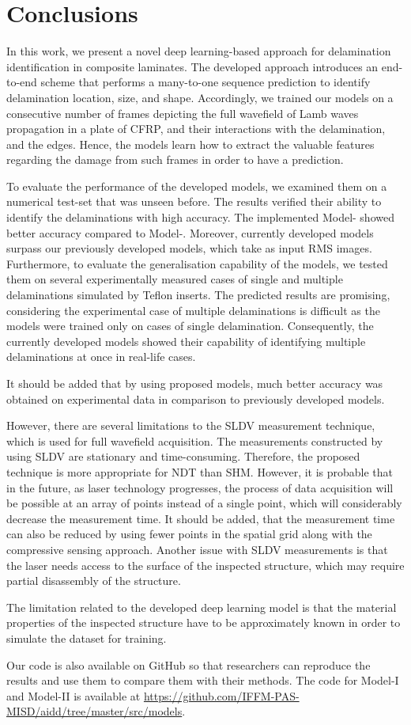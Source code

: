 \section{Conclusions}
\label{conclusion}
In this work, we present a novel deep learning-based approach for delamination identification in composite laminates.
The developed approach introduces an end-to-end scheme that performs a many-to-one sequence prediction to identify delamination location, size, and shape.
Accordingly, we trained our models on a consecutive number of frames depicting the full wavefield of Lamb waves propagation in a plate of CFRP, and their interactions with the delamination, and the edges.
Hence, the models learn how to extract the valuable features regarding the damage from such frames in order to have a prediction.

To evaluate the performance of the developed models, we examined them on a numerical test-set that was unseen before.
The results verified their ability to identify the delaminations with high accuracy. 
The implemented Model- showed better accuracy compared to Model-.
Moreover, currently developed models surpass our previously developed models, which take as input RMS images.
Furthermore, to evaluate the generalisation capability of the models, we tested them on several experimentally measured cases of single and multiple delaminations simulated by Teflon inserts.
The predicted results are promising, considering the experimental case of multiple delaminations is difficult as the models were trained only on cases of single delamination.
Consequently, the currently developed models showed their capability of identifying multiple delaminations at once in real-life cases.

It should be added that by using proposed models, much better accuracy was obtained on experimental data in comparison to previously developed models.

However, there are several limitations to the SLDV measurement technique, which is used for full wavefield acquisition.
The measurements constructed by using SLDV are stationary and time-consuming.
Therefore, the proposed technique is more appropriate for NDT than SHM.
However, it is probable that in the future, as laser technology progresses, the process of data acquisition will be possible at an array of points instead of a single point, which will considerably decrease the measurement time.
It should be added, that the measurement time can also be reduced by using fewer points in the spatial grid along with the compressive sensing approach.
Another issue with SLDV measurements is that the laser needs access to the surface of the inspected structure, which may require partial disassembly of the structure.

The limitation related to the developed deep learning model is that the material properties of the inspected structure have to be approximately known in order to simulate the dataset for training.

Our code is also available on GitHub so that researchers can reproduce the results and use them to compare them with their methods. 
The code for Model-I and Model-II is available at \url{https://github.com/IFFM-PAS-MISD/aidd/tree/master/src/models}.
